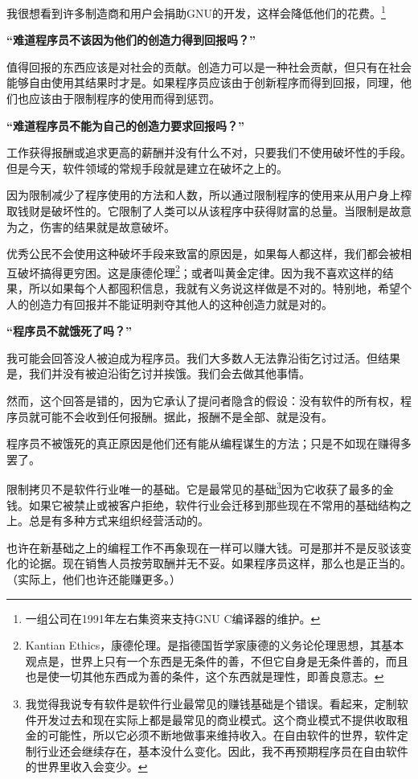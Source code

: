 我很想看到许多制造商和用户会捐助GNU的开发，这样会降低他们的花费。\footnote{一组公司在1991年左右集资来支持GNU C编译器的维护。}\par
\bf“难道程序员不该因为他们的创造力得到回报吗？”\normalall\par
值得回报的东西应该是对社会的贡献。创造力可以是一种社会贡献，但只有在社会能够自由使用其结果时才是。如果程序员应该由于创新程序而得到回报，同理，他们也应该由于限制程序的使用而得到惩罚。\par
\bf“难道程序员不能为自己的创造力要求回报吗？\normalall”\par
工作获得报酬或追求更高的薪酬并没有什么不对，只要我们不使用破坏性的手段。但是今天，软件领域的常规手段就是建立在破坏之上的。\par
因为限制减少了程序使用的方法和人数，所以通过限制程序的使用来从用户身上榨取钱财是破坏性的。它限制了人类可以从该程序中获得财富的总量。当限制是故意为之，伤害的结果就是故意破坏。\par
优秀公民不会使用这种破坏手段来致富的原因是，如果每人都这样，我们都会被相互破坏搞得更穷困。这是康德伦理\footnote{Kantian Ethics，康德伦理。是指德国哲学家康德的义务论伦理思想，其基本观点是，世界上只有一个东西是无条件的善，不但它自身是无条件善的，而且也是使一切其他东西成为善的条件，这个东西就是理性，即善良意志。}；或者叫黄金定律。因为我不喜欢这样的结果，所以如果每个人都囤积信息，我就有义务说这样做是不对的。特别地，希望个人的创造力有回报并不能证明剥夺其他人的这种创造力就是对的。\par
\bf“程序员不就饿死了吗？”\normalall\par
我可能会回答没人被迫成为程序员。我们大多数人无法靠沿街乞讨过活。但结果是，我们并没有被迫沿街乞讨并挨饿。我们会去做其他事情。\par
然而，这个回答是错的，因为它承认了提问者隐含的假设：没有软件的所有权，程序员就可能不会收到任何报酬。据此，报酬不是全部、就是没有。\par
程序员不被饿死的真正原因是他们还有能从编程谋生的方法；只是不如现在赚得多罢了。\par
限制拷贝不是软件行业唯一的基础。它是最常见的基础\footnote{我觉得我说专有软件是软件行业最常见的赚钱基础是个错误。看起来，定制软件开发过去和现在实际上都是最常见的商业模式。这个商业模式不提供收取租金的可能性，所以它必须不断地做事来维持收入。在自由软件的世界，软件定制行业还会继续存在，基本没什么变化。因此，我不再预期程序员在自由软件的世界里收入会变少。}因为它收获了最多的金钱。如果它被禁止或被客户拒绝，软件行业会迁移到那些现在不常用的基础结构之上。总是有多种方式来组织经营活动的。\par
也许在新基础之上的编程工作不再象现在一样可以赚大钱。可是那并不是反驳该变化的论据。现在销售人员按劳取酬并无不妥。如果程序员这样，那么也是正当的。（实际上，他们也许还能赚更多。）\par
